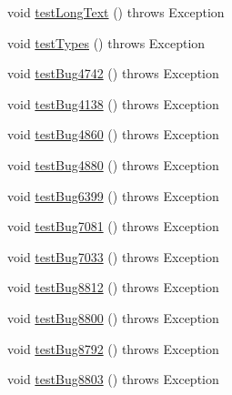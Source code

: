 \begin{DoxyCompactItemize}
\item 
void \mbox{\hyperlink{classtestsuite_1_1regression_1_1_meta_data_regression_test_abc6512da546efa8175bd8245a997d554}{test\+Long\+Text}} ()  throws Exception 
\item 
void \mbox{\hyperlink{classtestsuite_1_1regression_1_1_meta_data_regression_test_a538c5b4ba85f2b4160bcaa4885f13142}{test\+Types}} ()  throws Exception 
\item 
void \mbox{\hyperlink{classtestsuite_1_1regression_1_1_meta_data_regression_test_aacb167d12465f3fad1e2723a82c2300e}{test\+Bug4742}} ()  throws Exception 
\item 
void \mbox{\hyperlink{classtestsuite_1_1regression_1_1_meta_data_regression_test_a5c0ea954c7204a811055ea0487e75862}{test\+Bug4138}} ()  throws Exception 
\item 
void \mbox{\hyperlink{classtestsuite_1_1regression_1_1_meta_data_regression_test_a9c33a8fd6a670158feb2efa4cbf966ad}{test\+Bug4860}} ()  throws Exception 
\item 
void \mbox{\hyperlink{classtestsuite_1_1regression_1_1_meta_data_regression_test_a5f79cbc323ee6b50a304811b962f4b37}{test\+Bug4880}} ()  throws Exception 
\item 
void \mbox{\hyperlink{classtestsuite_1_1regression_1_1_meta_data_regression_test_ad90f2153ff1faa28e41a28116ad400ca}{test\+Bug6399}} ()  throws Exception 
\item 
void \mbox{\hyperlink{classtestsuite_1_1regression_1_1_meta_data_regression_test_af6e2170c6b9b3b1ff9beddf8dc1c2aa9}{test\+Bug7081}} ()  throws Exception 
\item 
void \mbox{\hyperlink{classtestsuite_1_1regression_1_1_meta_data_regression_test_a810a4101f87e44b30caa45239a86b4d5}{test\+Bug7033}} ()  throws Exception 
\item 
void \mbox{\hyperlink{classtestsuite_1_1regression_1_1_meta_data_regression_test_a2e1523fa5764c3a574ab345132d80ccb}{test\+Bug8812}} ()  throws Exception 
\item 
void \mbox{\hyperlink{classtestsuite_1_1regression_1_1_meta_data_regression_test_a348ef415a6528252b8b3db3a8af6e3d9}{test\+Bug8800}} ()  throws Exception 
\item 
void \mbox{\hyperlink{classtestsuite_1_1regression_1_1_meta_data_regression_test_ac05ecaf65c43b94713d2dc0ab3430a94}{test\+Bug8792}} ()  throws Exception 
\item 
void \mbox{\hyperlink{classtestsuite_1_1regression_1_1_meta_data_regression_test_a2f5b71ea6cea2579da1f5fd73cd93227}{test\+Bug8803}} ()  throws Exception 

\end{DoxyCompactItemize}
